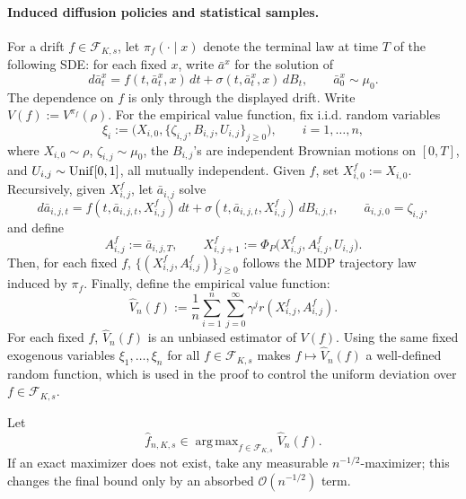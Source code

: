 \documentclass{article}
\newcommand{\1}{\mathbbm{1}}
\DeclareMathOperator*{\argmax}{arg\,max}
\numberwithin{equation}{section}
\begin{document}
\paragraph{Induced diffusion policies and statistical samples.}
For a drift \(f\in\mathcal F_{K,s}\), let \(\pi_f(\cdot\mid x)\) denote the terminal law at time \(T\) of the following SDE: for each fixed \(x\), write \(\bar a^x\) for the solution of
\[
d\bar a_t^x=f(t,\bar a_t^x,x)\,dt+
\sigma(t,\bar a_t^x,x)\,dB_t,
\qquad \bar a_0^x\sim\mu_0 .
\]
The dependence on \(f\) is only through the displayed drift. Write \(V(f):=V^{\pi_f}(\rho)\). For the empirical value function, fix i.i.d. random variables
\[
\xi_i:=\bigl(X_{i,0},\{\zeta_{i,j},B_{i,j},U_{i,j}\}_{j\ge0}\bigr),
\qquad i=1,\ldots,n,
\]
where \(X_{i,0}\sim\rho\), \(\zeta_{i,j}\sim\mu_0\), the \(B_{i,j}\)'s are independent Brownian motions on \([0,T]\), and \(U_{i,j}\sim{\rm Unif}[0,1]\), all mutually independent. Given \(f\), set \(X_{i,0}^f:=X_{i,0}\). Recursively, given \(X_{i,j}^f\), let \(\bar a_{i,j}\) solve
\[
d\bar a_{i,j,t}=f(t,\bar a_{i,j,t},X_{i,j}^f)\,dt+
\sigma(t,\bar a_{i,j,t},X_{i,j}^f)\,dB_{i,j,t},
\qquad \bar a_{i,j,0}=\zeta_{i,j},
\]
and define
\[
A_{i,j}^f:=\bar a_{i,j,T},
\qquad
X_{i,j+1}^f:=\Phi_P\bigl(X_{i,j}^f,A_{i,j}^f,U_{i,j}\bigr).
\]
Then, for each fixed \(f\), \(\{(X_{i,j}^f,A_{i,j}^f)\}_{j\ge0}\) follows the MDP trajectory law induced by \(\pi_f\). Finally, define the empirical value function:
\begin{equation}
\label{eq:empirical_value}
\widehat V_n(f)
:=
\frac1n\sum_{i=1}^n\sum_{j=0}^{\infty}
\gamma^j r(X_{i,j}^f,A_{i,j}^f).
\end{equation}
For each fixed \(f\), \(\widehat V_n(f)\) is an unbiased estimator of \(V(f)\). 
Using the same fixed exogenous variables \(\xi_1,\ldots,\xi_n\) for all 
\(f\in\mathcal F_{K,s}\) makes \(f\mapsto\widehat V_n(f)\) a well-defined 
 random function, which is used in the proof to control the uniform deviation 
over \(f\in\mathcal F_{K,s}\).

Let
\begin{equation}
\label{eq:empirical-general-drift-optimizer}
\widehat f_{n,K,s}
\in
\argmax_{f\in\mathcal F_{K,s}}\widehat V_n(f).
\end{equation}
If an exact maximizer does not exist, take any measurable \(n^{-1/2}\)-maximizer; this changes the final bound only by an absorbed \(\mathcal{O}(n^{-1/2})\) term.
\end{document}
